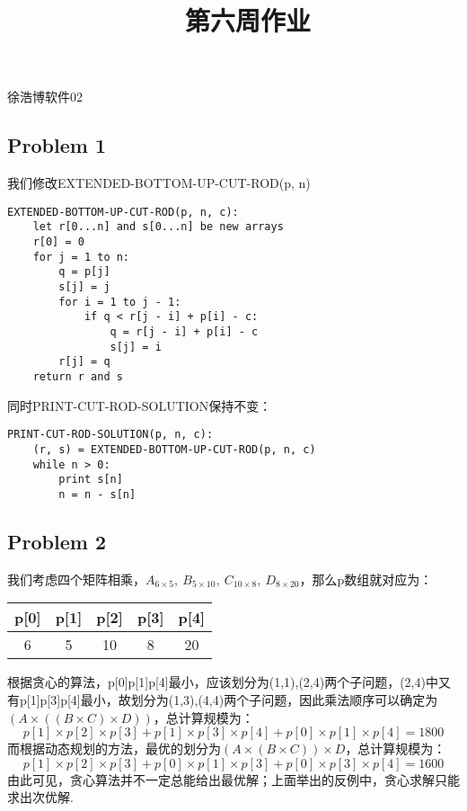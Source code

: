 \documentclass[UTF8]{ctexart}
\begin{document}
\renewcommand{\thefootnote}{\fnsymbol{footnote}}
\linespread{1.4}
\title{\vspace{-5em}\ \ 第六周作业\vspace{-2.5em}}
\date{}
\maketitle
\begin{center}
{\fangsong 徐浩博\quad 软件02}
\end{center}


\subsection*{Problem 1}
我们修改EXTENDED-BOTTOM-UP-CUT-ROD(p, n)
\begin{lstlisting}
EXTENDED-BOTTOM-UP-CUT-ROD(p, n, c):
	let r[0...n] and s[0...n] be new arrays
	r[0] = 0
	for j = 1 to n:
		q = p[j]
		s[j] = j
		for i = 1 to j - 1:
			if q < r[j - i] + p[i] - c:
				q = r[j - i] + p[i] - c
				s[j] = i
		r[j] = q
	return r and s
\end{lstlisting}
同时PRINT-CUT-ROD-SOLUTION保持不变：
\begin{lstlisting}
PRINT-CUT-ROD-SOLUTION(p, n, c):
	(r, s) = EXTENDED-BOTTOM-UP-CUT-ROD(p, n, c)
	while n > 0:
		print s[n]
		n = n - s[n]
\end{lstlisting}

\subsection*{Problem 2}
我们考虑四个矩阵相乘，$A_{6\times 5},\ B_{5\times 10},\ C_{10\times 8},\ D_{8\times 20}$，那么p数组就对应为：\\

\begin{table}[H]\begin{center}
\begin{tabular}{c|c|c|c|c}
	\hline
	p[0]&p[1]&p[2]&p[3]&p[4]\\
	\hline
	6&5&10&8&20\\
	\hline
\end{tabular}\end{center}
\end{table}
根据贪心的算法，p[0]p[1]p[4]最小，应该划分为(1,1),(2,4)两个子问题，(2,4)中又有p[1]p[3]p[4]最小，故划分为(1,3),(4,4)两个子问题，因此乘法顺序可以确定为$(A\times((B\times C)\times D))$，总计算规模为：
$$p[1]\times p[2]\times p[3]+p[1]\times p[3]\times p[4]+p[0]\times p[1]\times p[4]=1800$$
而根据动态规划的方法，最优的划分为$(A\times(B\times C))\times D$，总计算规模为：
$$p[1]\times p[2]\times p[3]+p[0]\times p[1]\times p[3]+p[0]\times p[3]\times p[4]=1600$$
由此可见，贪心算法并不一定总能给出最优解；上面举出的反例中，贪心求解只能求出次优解.
\end{document}
